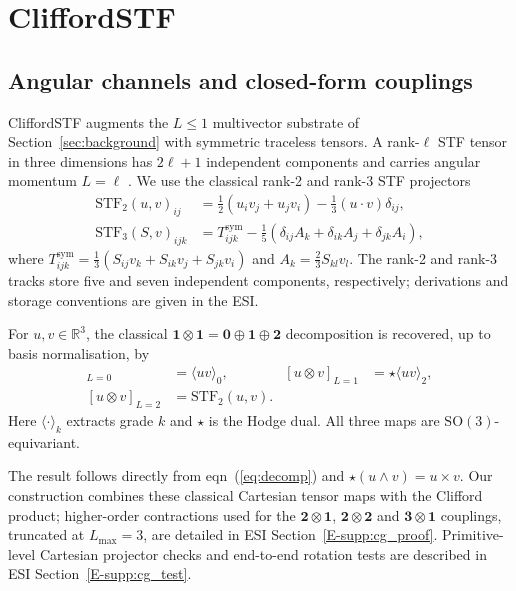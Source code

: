 \section{CliffordSTF}\label{sec:method}


\subsection{Angular channels and closed-form couplings}\label{sec:limitation}\label{sec:stf_channels}

CliffordSTF augments the $L{\leq}1$ multivector substrate of Section~\ref{sec:background} with symmetric traceless tensors. A rank-$\ell$ STF tensor in three dimensions has $2\ell+1$ independent components and carries angular momentum $L{=}\ell$ \cite{applequist1989traceless}. We use the classical rank-2 and rank-3 STF projectors \cite{thorne1980multipole}
\begin{align}
\mathrm{STF}_2(u,v)_{ij} &= \tfrac12(u_iv_j+u_jv_i)-\tfrac13(u\cdot v)\delta_{ij}, \\
\mathrm{STF}_3(S,v)_{ijk} &= T^{\mathrm{sym}}_{ijk}-\tfrac15(\delta_{ij}A_k+\delta_{ik}A_j+\delta_{jk}A_i),
\end{align}
where $T^{\mathrm{sym}}_{ijk}=\tfrac13(S_{ij}v_k+S_{ik}v_j+S_{jk}v_i)$ and $A_k=\tfrac23S_{kl}v_l$. The rank-2 and rank-3 tracks store five and seven independent components, respectively; derivations and storage conventions are given in the ESI.

\begin{theorem}\label{thm:cg_completeness}
For $u,v\in\mathbb{R}^3$, the classical $\mathbf{1}\otimes\mathbf{1}=\mathbf{0}\oplus\mathbf{1}\oplus\mathbf{2}$ decomposition \cite{coope1965irreducible} is recovered, up to basis normalisation, by
\begin{align*}
[u\otimes v]_{L=0}&=\langle uv\rangle_0, & [u\otimes v]_{L=1}&=\star\langle uv\rangle_2, \\
[u\otimes v]_{L=2}&=\mathrm{STF}_2(u,v).
\end{align*}
Here $\langle\cdot\rangle_k$ extracts grade $k$ and $\star$ is the Hodge dual. All three maps are $\mathrm{SO}(3)$-equivariant.
\end{theorem}

The result follows directly from eqn~(\ref{eq:decomp}) and $\star(u\wedge v)=u\times v$. Our construction combines these classical Cartesian tensor maps with the Clifford product; higher-order contractions used for the $\mathbf{2}\otimes\mathbf{1}$, $\mathbf{2}\otimes\mathbf{2}$ and $\mathbf{3}\otimes\mathbf{1}$ couplings, truncated at $L_{\max}{=}3$, are detailed in ESI Section~\ref{E-supp:cg_proof}. Primitive-level Cartesian projector checks and end-to-end rotation tests are described in ESI Section~\ref{E-supp:cg_test}.

